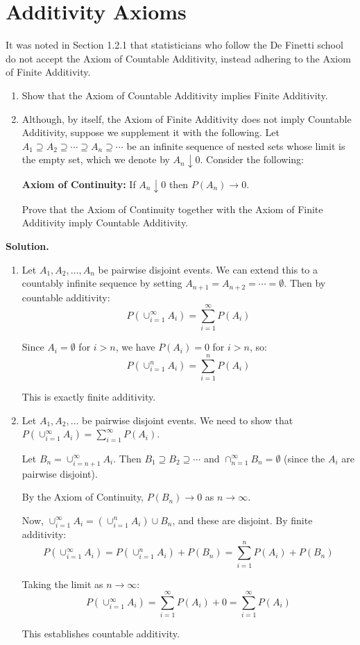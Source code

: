\section{Additivity Axioms}

\begin{problembox}
It was noted in Section 1.2.1 that statisticians who follow the De Finetti school do not accept the Axiom of Countable Additivity, instead adhering to the Axiom of Finite Additivity.
\begin{enumerate}[label=(\alph*)]
    \item Show that the Axiom of Countable Additivity implies Finite Additivity.
    \item Although, by itself, the Axiom of Finite Additivity does not imply Countable Additivity, suppose we supplement it with the following. Let $A_1 \supseteq A_2 \supseteq \cdots \supseteq A_n \supseteq \cdots$ be an infinite sequence of nested sets whose limit is the empty set, which we denote by $A_n \downarrow 0$. Consider the following:
    
    \textbf{Axiom of Continuity:} If $A_n \downarrow 0$ then $P(A_n) \to 0$.
    
    Prove that the Axiom of Continuity together with the Axiom of Finite Additivity imply Countable Additivity.
\end{enumerate}
\end{problembox}

\noindent\textbf{Solution.}
\begin{enumerate}[label=(\alph*)]
    \item Let $A_1, A_2, \ldots, A_n$ be pairwise disjoint events. We can extend this to a countably infinite sequence by setting $A_{n+1} = A_{n+2} = \cdots = \emptyset$. Then by countable additivity:
    \[ P(\cup_{i=1}^{\infty} A_i) = \sum_{i=1}^{\infty} P(A_i) \]
    
    Since $A_i = \emptyset$ for $i > n$, we have $P(A_i) = 0$ for $i > n$, so:
    \[ P(\cup_{i=1}^{n} A_i) = \sum_{i=1}^{n} P(A_i) \]
    
    This is exactly finite additivity.
    
    \item Let $A_1, A_2, \ldots$ be pairwise disjoint events. We need to show that $P(\cup_{i=1}^{\infty} A_i) = \sum_{i=1}^{\infty} P(A_i)$.
    
    Let $B_n = \cup_{i=n+1}^{\infty} A_i$. Then $B_1 \supseteq B_2 \supseteq \cdots$ and $\cap_{n=1}^{\infty} B_n = \emptyset$ (since the $A_i$ are pairwise disjoint).
    
    By the Axiom of Continuity, $P(B_n) \to 0$ as $n \to \infty$.
    
    Now, $\cup_{i=1}^{\infty} A_i = (\cup_{i=1}^{n} A_i) \cup B_n$, and these are disjoint. By finite additivity:
    \[ P(\cup_{i=1}^{\infty} A_i) = P(\cup_{i=1}^{n} A_i) + P(B_n) = \sum_{i=1}^{n} P(A_i) + P(B_n) \]
    
    Taking the limit as $n \to \infty$:
    \[ P(\cup_{i=1}^{\infty} A_i) = \sum_{i=1}^{\infty} P(A_i) + 0 = \sum_{i=1}^{\infty} P(A_i) \]
    
    This establishes countable additivity.
\end{enumerate}


